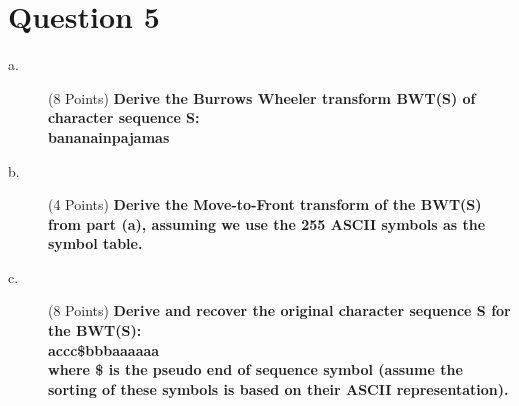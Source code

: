 \documentclass[a4paper]{article}
\begin{document}
\section*{Question 5}
  \begin{spacing}{1.5}
    \begin{description}
      \item[a.] (8 Points) \textbf{Derive the Burrows Wheeler transform BWT(S) of character sequence S:\\
      bananainpajamas}\\
      \item[b.] (4 Points) \textbf{Derive the Move-to-Front transform of the BWT(S) from part (a), assuming we use the 255 ASCII symbols as the symbol table.}\\
      \item[c.] (8 Points) \textbf{Derive and recover the original character sequence S for the BWT(S):\\
      accc\$bbbaaaaaa\\
      where \$ is the pseudo end of sequence symbol (assume the sorting of these symbols is based on their ASCII representation).}\\
    \end{description}
  \end{spacing}
\end{document}
